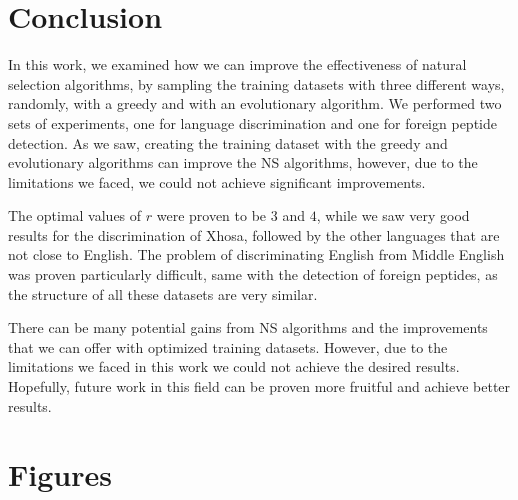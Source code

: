 \documentclass{article}
\begin{document}
\section{Conclusion}
In this work, we examined how we can improve the effectiveness of natural selection algorithms, by sampling the training
datasets with three different ways, randomly, with a greedy and with an evolutionary algorithm. We performed two sets of
experiments, one for language discrimination and one for foreign peptide detection. As we saw, creating the training
dataset with the greedy and evolutionary algorithms can improve the NS algorithms, however, due to the limitations we
faced, we could not achieve significant improvements.

The optimal values of $r$ were proven to be $3$ and $4$, while we saw very good results for the discrimination of Xhosa,
followed by the other languages that are not close to English. The problem of discriminating English from Middle English
was proven particularly difficult, same with the detection of foreign peptides, as the structure of all these datasets
are very similar.

There can be many potential gains from NS algorithms and the improvements that we can offer with optimized training
datasets. However, due to the limitations we faced in this work we could not achieve the desired results. Hopefully, 
future work in this field can be proven more fruitful and achieve better results.


\printbibliography

\appendix
\section{Figures}
\end{document}
